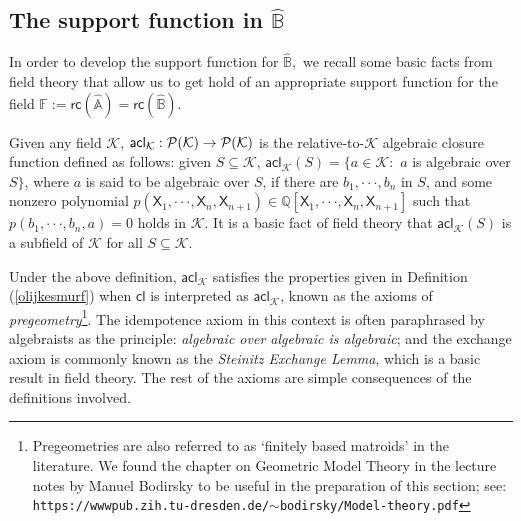 \documentclass{amsart}
\newcommand{\mc}[1]{\mathcal #1}
\begin{document}
\subsection{The support function in $\hat{\mathbb{B}}$}
In order to develop the support function for $\hat{\mathbb{B}},$ we recall
some basic facts from field theory that allow us to get hold of an appropriate support
function for the field $\mathbb{F}:=\mathsf{rc}(\hat{\mathbb{A}})=%
\mathsf{rc}(\hat{\mathbb{B}})$.

Given any field $\mathcal{K}$, $\mathsf{acl}_{\mathcal{K}}:\mathcal{%
P}(\mathcal{K})\rightarrow \mathcal{P}(\mathcal{K})$ is the relative-to-$\mc K$ algebraic closure function  defined as follows: given  $S\subseteq 
\mathcal{K}$, $\mathsf{acl}_{\mathcal{K}}(S)=\{a\in \mathcal{K}:$ $a$ is
algebraic over $S\}$, where $a$ is said to be algebraic over $S$, if there
are $b_{1},\cdot \cdot \cdot ,b_{n}$ in $S$, and some nonzero polynomial $p(%
\mathsf{X}_{1},\cdot \cdot \cdot ,\mathsf{X}_{n},\mathsf{X}_{n+1})\in 
\mathbb{Q}[\mathsf{X}_{1},\cdot \cdot \cdot ,\mathsf{X}_{n},\mathsf{X}_{n+1}]
$ such that $p(b_{1},\cdot \cdot \cdot ,b_{n},a)=0$ holds in $\mathcal{K}$. It is a basic fact of field theory that $\mathsf{acl}_{\mathcal{K}}(S)$ is a subfield of $\mathcal{K}$ for all $S\subseteq \mathcal{K}$.

Under the above definition, $\mathsf{acl}_{\mathcal{K}}$ satisfies the
 properties given in Definition (\ref{olijkesmurf}) when $%
\mathsf{cl}$ is interpreted as $\mathsf{acl}_{\mathcal{K}}$, known as the axioms of \textit{pregeometry}\footnote{Pregeometries are also referred to as `finitely based matroids' in the literature. We found the chapter on Geometric Model Theory in the lecture notes by Manuel Bodirsky to be useful in the preparation of this section; see:\\
\hspace*{2cm}\tt{https://wwwpub.zih.tu-dresden.de/$\sim$bodirsky/Model-theory.pdf}}. The idempotence axiom in this context is often paraphrased by algebraists as the principle: \emph{algebraic over algebraic is algebraic}; and the exchange axiom is commonly known as the \emph{Steinitz Exchange Lemma}, which is a basic result in field theory. The rest of the axioms are simple consequences of the definitions involved.
\end{document}
